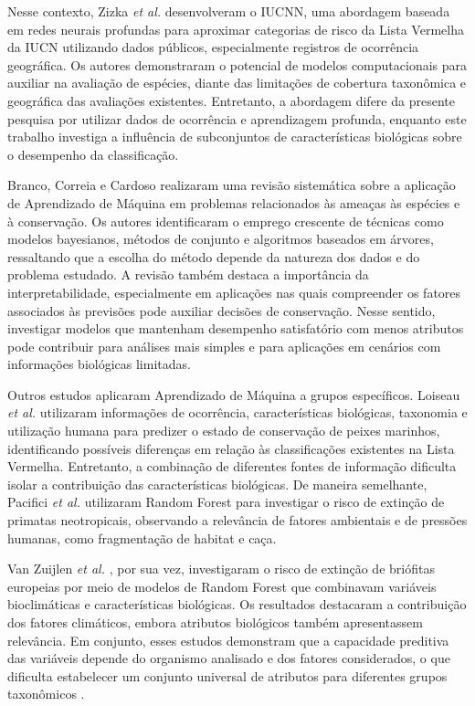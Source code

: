 \documentclass[conference]{IEEEtran}
\begin{document}
Nesse contexto, Zizka \textit{et al.} \cite{b6} desenvolveram o IUCNN, uma abordagem baseada em redes neurais profundas para aproximar categorias de risco da Lista Vermelha da IUCN utilizando dados públicos, especialmente registros de ocorrência geográfica. Os autores demonstraram o potencial de modelos computacionais para auxiliar na avaliação de espécies, diante das limitações de cobertura taxonômica e geográfica das avaliações existentes. Entretanto, a abordagem difere da presente pesquisa por utilizar dados de ocorrência e aprendizagem profunda, enquanto este trabalho investiga a influência de subconjuntos de características biológicas sobre o desempenho da classificação.

Branco, Correia e Cardoso \cite{b7} realizaram uma revisão sistemática sobre a aplicação de Aprendizado de Máquina em problemas relacionados às ameaças às espécies e à conservação. Os autores identificaram o emprego crescente de técnicas como modelos bayesianos, métodos de conjunto e algoritmos baseados em árvores, ressaltando que a escolha do método depende da natureza dos dados e do problema estudado. A revisão também destaca a importância da interpretabilidade, especialmente em aplicações nas quais compreender os fatores associados às previsões pode auxiliar decisões de conservação. Nesse sentido, investigar modelos que mantenham desempenho satisfatório com menos atributos pode contribuir para análises mais simples e para aplicações em cenários com informações biológicas limitadas.

Outros estudos aplicaram Aprendizado de Máquina a grupos específicos. Loiseau \textit{et al.} \cite{b8} utilizaram informações de ocorrência, características biológicas, taxonomia e utilização humana para predizer o estado de conservação de peixes marinhos, identificando possíveis diferenças em relação às classificações existentes na Lista Vermelha. Entretanto, a combinação de diferentes fontes de informação dificulta isolar a contribuição das características biológicas. De maneira semelhante, Pacifici \textit{et al.} \cite{b9} utilizaram Random Forest para investigar o risco de extinção de primatas neotropicais, observando a relevância de fatores ambientais e de pressões humanas, como fragmentação de habitat e caça.

Van Zuijlen \textit{et al.} \cite{b10}, por sua vez, investigaram o risco de extinção de briófitas europeias por meio de modelos de Random Forest que combinavam variáveis bioclimáticas e características biológicas. Os resultados destacaram a contribuição dos fatores climáticos, embora atributos biológicos também apresentassem relevância. Em conjunto, esses estudos demonstram que a capacidade preditiva das variáveis depende do organismo analisado e dos fatores considerados, o que dificulta estabelecer um conjunto universal de atributos para diferentes grupos taxonômicos \cite{b5,b9,b10}.
\end{document}
